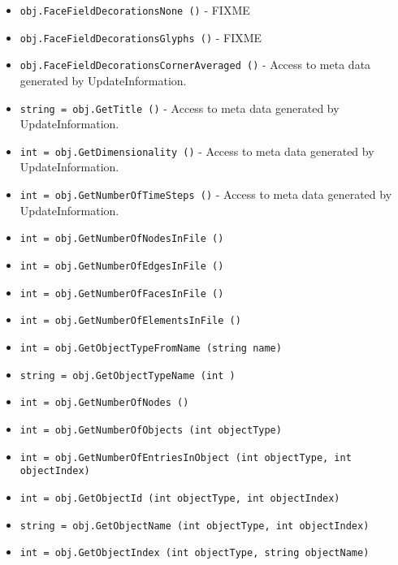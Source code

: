 \begin{itemize}
\item  \verb|obj.FaceFieldDecorationsNone ()| -  FIXME

\item  \verb|obj.FaceFieldDecorationsGlyphs ()| -  FIXME

\item  \verb|obj.FaceFieldDecorationsCornerAveraged ()| -  Access to meta data generated by UpdateInformation.

\item  \verb|string = obj.GetTitle ()| -  Access to meta data generated by UpdateInformation.

\item  \verb|int = obj.GetDimensionality ()| -  Access to meta data generated by UpdateInformation.

\item  \verb|int = obj.GetNumberOfTimeSteps ()| -  Access to meta data generated by UpdateInformation.

\item  \verb|int = obj.GetNumberOfNodesInFile ()|

\item  \verb|int = obj.GetNumberOfEdgesInFile ()|

\item  \verb|int = obj.GetNumberOfFacesInFile ()|

\item  \verb|int = obj.GetNumberOfElementsInFile ()|

\item  \verb|int = obj.GetObjectTypeFromName (string name)|

\item  \verb|string = obj.GetObjectTypeName (int )|

\item  \verb|int = obj.GetNumberOfNodes ()|

\item  \verb|int = obj.GetNumberOfObjects (int objectType)|

\item  \verb|int = obj.GetNumberOfEntriesInObject (int objectType, int objectIndex)|

\item  \verb|int = obj.GetObjectId (int objectType, int objectIndex)|

\item  \verb|string = obj.GetObjectName (int objectType, int objectIndex)|

\item  \verb|int = obj.GetObjectIndex (int objectType, string objectName)|


\end{itemize}

